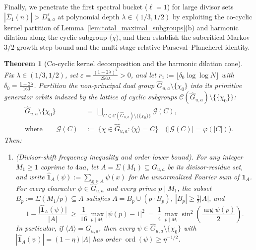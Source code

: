 \documentclass[11pt, a4paper]{article}
\theoremstyle{plain}
\newtheorem{theorem}{Theorem}[section]
\theoremstyle{definition}
\begin{document}
Finally, we penetrate the first spectral bucket ($\ell=1$) for large divisor sets $|\overline{\Sigma}_1(n)|>D_{u,a}^{\varepsilon}$ at polynomial depth $\lambda\in(1/3,1/2)$ by exploiting the co-cyclic kernel partition of Lemma~\ref{lem:total_maximal_subgroups}(b) and harmonic dilation along the cyclic subgroup $\langle\chi\rangle$, and then establish the subcritical Markov $3/2$-growth step bound and the multi-stage relative Parseval--Plancherel identity.

\begin{theorem}[Co-cyclic kernel decomposition and the harmonic dilation cone]\label{thm:harmonic_dilation_bucket1}
Fix $\lambda\in\allowbreak(1/\allowbreak 3,\allowbreak 1/2)$, set $\varepsilon=\frac{(1-2\lambda)^{2}}{256\lambda}>0$, and let $r_1:=\lfloor\delta_0\log\log N\rfloor$ with $\delta_0=\frac{1-2\lambda}{160}$. Partition the non-principal dual group $\widehat{G}_{u,a}\setminus\{\chi_0\}$ into its primitive generator orbits indexed by the lattice of cyclic subgroups $\mathcal{C}(\widehat{G}_{u,a})\setminus\{\{\chi_0\}\}$:
\begin{equation}\label{eq:cocyclic_orbit_partition}
\begin{aligned}
\widehat{G}_{u,a}\setminus\{\chi_0\}\ &=\ \bigsqcup_{C\in\mathcal{C}(\widehat{G}_{u,a})\setminus\{\{\chi_0\}\}}\mathcal{G}(C),\\
\text{where}\qquad\mathcal{G}(C)\ &:=\ \big\{\chi\in\widehat{G}_{u,a}:\langle\chi\rangle=C\big\}\quad\big(|\mathcal{G}(C)|=\varphi(|C|)\big).
\end{aligned}
\end{equation}
Then:
\begin{enumerate}[label=(\alph*)]
    \item \emph{(Divisor-shift frequency inequality and order lower bound).} 
    For any integer $M_1\ge1$ coprime to $4ua$, let $A=\Sigma(M_1)\subseteq G_{u,a}$ be its divisor-residue set, and write $\widehat{\mathbf{1}}_A(\psi):=\sum_{x\in A}\psi(x)$ for the unnormalized Fourier sum of $\mathbf{1}_A$. For every character $\psi\in\widehat{G}_{u,a}$ and every prime $p\mid M_1$, the subset $B_p:=\Sigma(M_1/p)\subseteq A$ satisfies $A=B_p\cup(p\cdot B_p)$, $|B_p|\ge\frac12|A|$, and
    \begin{equation}\label{eq:Bp_divisor_shift_inequality}
    1-\frac{\big|\widehat{\mathbf{1}}_A(\psi)\big|}{|A|}\ \ge\ \frac{1}{16}\,\max_{p\mid M_1}\big|\psi(p)-1\big|^{2}\ =\ \frac14\,\max_{p\mid M_1}\sin^{2}\!\left(\frac{\arg\psi(p)}{2}\right).
    \end{equation}
    In particular, if $\langle A\rangle=G_{u,a}$, then every $\psi\in\widehat{G}_{u,a}\setminus\{\chi_0\}$ with $|\widehat{\mathbf{1}}_A(\psi)|=(1-\eta)|A|$ has order $\operatorname{ord}(\psi)\ge\eta^{-1/2}$.
    

\end{enumerate}
\end{theorem}
\end{document}

